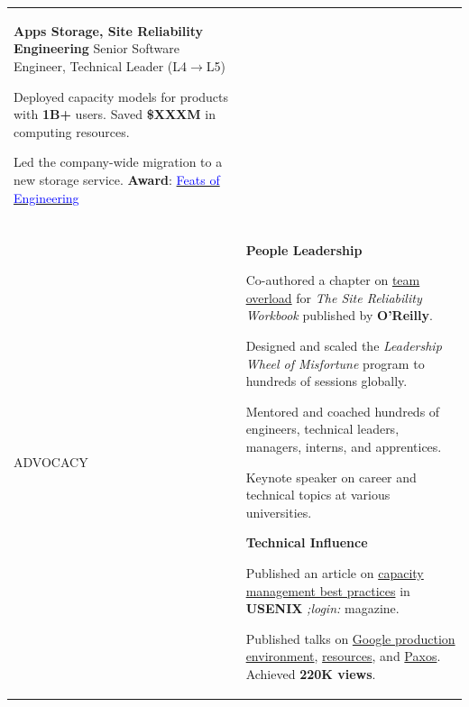 \documentclass[letterpaper,10pt,oneside]{article}
\newcommand{\itemspacing}{\vspace{0.12cm}}
\newcommand{\sref}[2]{%
    \href{https://0/local/attachments/#1}{\textcolor{blue}{#2}}%
}
\newenvironment{body}
{\par\par
\begin{longtable}{p{0.145\textwidth}p{0.81\textwidth}}
\endfirsthead
\noalign{\vspace{0.4cm}}
\endhead}
{\par\end{longtable}\par}
\renewcommand{\section}[3]{\\[-0.28cm]\pdfbookmark[2]{#2}{#3}\\%
\raggedleft  %
{\fontsize{9.5pt}{9.5pt}\selectfont\bfseries\raggedright%
\MakeUppercase{#1}}&}
\begin{document}
\begin{body}
\phantom{g}\textbf{Apps Storage, Site Reliability Engineering} \textemdash{ }Senior Software Engineer, Technical Leader (L4$\rightarrow$L5)
\begin{comp}
\item Deployed capacity models for products with \textbf{1B+} users. Saved \textbf{\$XXXM} in computing resources.
\item Led the company-wide migration to a new storage service. \textbf{Award}: \sref{Google-Award-FeatsOfEngineering-2018.pdf}{Feats of Engineering}
\end{comp}
\itemspacing
\section{Advocacy}{Advocacy}{PDF:Advocacy}
\textbf{People Leadership}
\begin{comp}
\item Co-authored a chapter on \href{https://landing.google.com/sre/workbook/chapters/overload/}{team overload} for \textit{The Site Reliability Workbook} published by \textbf{O'Reilly}.
\item Designed and scaled the \textit{Leadership Wheel of Misfortune} program to hundreds of sessions globally.
\item Mentored and coached hundreds of engineers, technical leaders, managers, interns, and apprentices.
\item Keynote speaker on career and technical topics at various universities.
\end{comp}
\itemspacing

\textbf{Technical Influence}
\begin{comp}
\item Published an article on \href{https://static.googleusercontent.com/media/sre.google/en//static/pdf/login\_winter20\_10\_torres.pdf}{capacity management best practices} in \textbf{USENIX} \textit{;login:} magazine.
\item Published talks on \href{https://youtu.be/dhTVVWzpc4Q}{Google production environment}, \href{https://youtu.be/pOo0oKNM9I8}{resources}, and \href{https://youtu.be/d7nAGI\_NZPk}{Paxos}. Achieved \textbf{220K views}.
\end{comp}
\itemspacing

\end{body}
\end{document}
